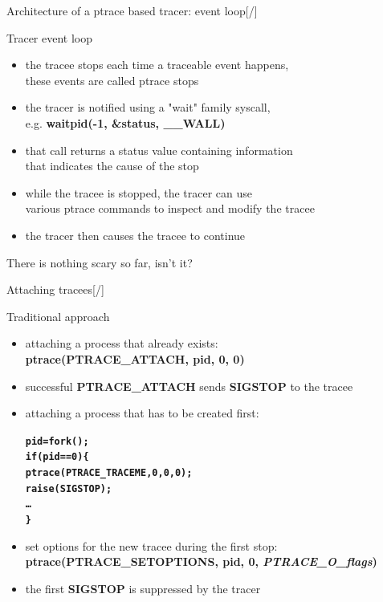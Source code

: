 \documentclass[unicode,aspectratio=169,xcolor={table,dvipsnames,usenames}]{beamer}
\begin{document}
\begin{frame}{\Large Architecture of a ptrace based tracer: event loop\hfill [\insertframenumber/\inserttotalframenumber]}
\Large
\begin{block}{Tracer event loop}
\begin{itemize}
	\item the tracee stops each time a traceable event happens, \\
		these events are called ptrace stops
	\item the tracer is notified using a "wait" family syscall, \\
		e.g. \textbf{waitpid(-1, \&status, \_\_WALL)}
	\item that call returns a status value containing information \\
		that indicates the cause of the stop
	\item while the tracee is stopped, the tracer can use \\
		various ptrace commands to inspect and modify the tracee
	\item the tracer then causes the tracee to continue
\end{itemize}
\end{block}

There is nothing scary so far, isn't it?
\end{frame}

\begin{frame}[fragile]{\Large Attaching tracees\hfill [\insertframenumber/\inserttotalframenumber]}
\large
\begin{block}{Traditional approach}
\begin{itemize}
	\item attaching a process that already exists: \\
		\textbf{ptrace(PTRACE\_ATTACH, pid, 0, 0)}
	\item successful \textbf{PTRACE\_ATTACH} sends \textbf{SIGSTOP} to the tracee
	\item attaching a process that has to be created first:
	\begin{alltt}\bf
		pid = fork();
		if (pid == 0) \{
		    ptrace(PTRACE_TRACEME, 0, 0, 0);
		    raise(SIGSTOP);
		    \ldots
		\}
	\end{alltt}
	\item set options for the new tracee during the first stop: \\
		\textbf{ptrace(PTRACE\_SETOPTIONS, pid, 0, \textit{PTRACE\_O\_flags})}
	\item the first \textbf{SIGSTOP} is suppressed by the tracer
\end{itemize}
\end{block}
\end{frame}
\end{document}
